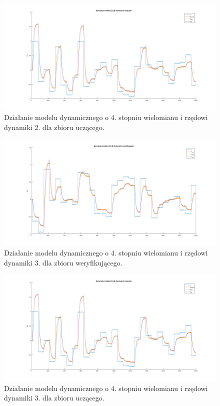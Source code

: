 \begin{figure}[H]
\centering
\includegraphics[width=16cm,trim={5cm 1cm 5cm 1cm},clip]{images/d22.png}
\caption{Działanie modelu dynamicznego o 4. stopniu wielomianu i rzędowi dynamiki 2. dla zbioru uczącego.}
\label{fig:d22}
\end{figure}
\begin{figure}[H]
\centering
\includegraphics[width=16cm,trim={5cm 1cm 5cm 1cm},clip]{images/d23.png}
\caption{Działanie modelu dynamicznego o 4. stopniu wielomianu i rzędowi dynamiki 3. dla zbioru weryfikującego.}
\label{fig:d23}
\end{figure}
\begin{figure}[H]
\centering
\includegraphics[width=16cm,trim={5cm 1cm 5cm 1cm},clip]{images/d24.png}
\caption{Działanie modelu dynamicznego o 4. stopniu wielomianu i rzędowi dynamiki 3. dla zbioru uczącego.}
\label{fig:d24}
\end{figure}
